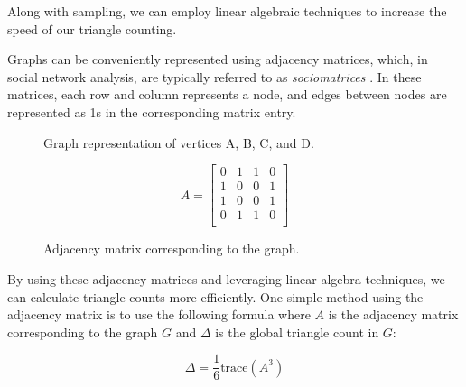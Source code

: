 \documentclass[11pt]{article}
\begin{document}
Along with sampling, we can employ linear algebraic techniques to increase the speed of our triangle counting.

Graphs can be conveniently represented using adjacency matrices, which, in social network analysis, are typically referred to as \emph{sociomatrices} \cite{beum_method_1950}. 
In these matrices, each row and column represents a node, and edges between nodes are represented as 1s in the corresponding matrix entry.

\begin{figure}[H]
    \centering
    \begin{minipage}{0.45\textwidth}
        \caption{Graph representation of vertices A, B, C, and D.}
    \end{minipage}%
    \hfill
    \begin{minipage}{0.45\textwidth}
        \[
        A =
        \begin{bmatrix}
        0 & 1 & 1 & 0 \\
        1 & 0 & 0 & 1 \\
        1 & 0 & 0 & 1 \\
        0 & 1 & 1 & 0 \\
        \end{bmatrix}
        \]
        \caption{Adjacency matrix corresponding to the graph.}
    \end{minipage}
\end{figure}

By using these adjacency matrices and leveraging linear algebra techniques, we can calculate triangle counts more efficiently. 
One simple method using the adjacency matrix is to use the following formula where $A$ is the adjacency matrix corresponding to the graph $G$ and $\Delta$ is the global triangle count in $G$:

\[
\Delta = \frac{1}{6} \mathrm{trace}(A^3)
\]
\end{document}
